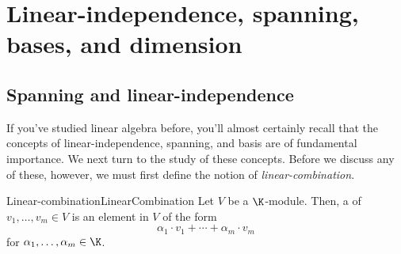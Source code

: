 \chapter{Linear-independence, spanning, bases, and dimension}

\section{Spanning and linear-independence}

If you've studied linear algebra before, you'll almost certainly recall that the concepts of linear-independence, spanning, and basis are of fundamental importance.  We next turn to the study of these concepts.  Before we discuss any of these, however, we must first define the notion of \emph{linear-combination}.
\begin{dfn}{Linear-combination}{LinearCombination}
	Let $V$ be a $\K$-module.  Then, a  of $v_1,\ldots ,v_m\in V$ is an element in $V$ of the form
	\begin{equation}
		\alpha _1\cdot v_1+\cdots +\alpha _m\cdot v_m
	\end{equation}
	for $\alpha _1,\ldots ,\alpha _m\in \K$.
\end{dfn}

